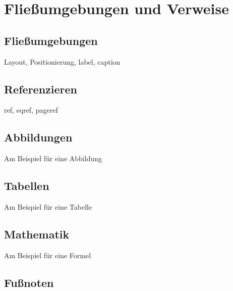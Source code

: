 \section{Fließumgebungen und Verweise}

\subsection{Fließumgebungen}
Layout, Positionierung, label, caption

\subsection{Referenzieren}
ref, eqref, pageref

\subsection{Abbildungen}
Am Beispiel für eine Abbildung

\subsection{Tabellen}
Am Beispiel für eine Tabelle

\subsection{Mathematik}
Am Beispiel für eine Formel

\subsection{Fußnoten}


\newpage